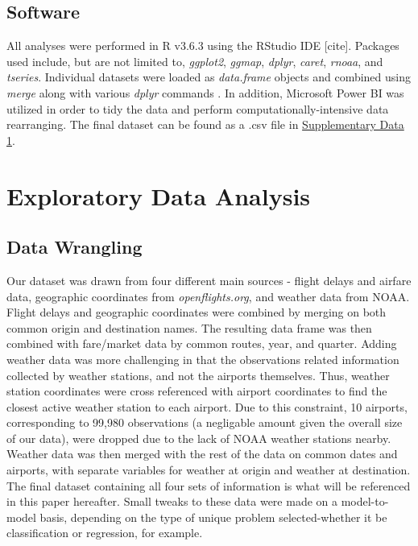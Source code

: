 \documentclass[12pt, a4paper]{book}
\newcommand\tab[1][1cm]{\hspace*{#1}}
\begin{document}
	\section{Software}
	\tab All analyses were performed in R v3.6.3 using the RStudio IDE [cite]. Packages used include, but are not limited to, \textit{ggplot2}, \textit{ggmap}, \textit{dplyr}, \textit{caret}, \textit{rnoaa}, and \textit{tseries}. Individual datasets were loaded as \textit{data.frame} objects and combined using \textit{merge} along with various \textit{dplyr} commands . In addition, Microsoft Power BI was utilized in order to tidy the data and perform computationally-intensive data rearranging. The final dataset can be found as a .csv file in \underline{Supplementary Data 1}.
	
\chapter{Exploratory Data Analysis}

	\section{Data Wrangling}
	
	\tab Our dataset was drawn from four different main sources - flight delays and airfare data, geographic coordinates from \textit{openflights.org}, and weather data from NOAA. Flight delays and geographic coordinates were combined by merging on both common origin and destination names. The resulting data frame was then combined with fare/market data by common routes, year, and quarter. Adding weather data was more challenging in that the observations related information collected by weather stations, and not the airports themselves. Thus, weather station coordinates were cross referenced with airport coordinates to find the closest active weather station to each airport. Due to this constraint, 10 airports, corresponding to 99,980 observations (a negligable amount given the overall size of our data), were dropped due to the lack of NOAA weather stations nearby. Weather data was then merged with the rest of the data on common dates and airports, with separate variables for weather at origin and weather at destination. The final dataset containing all four sets of information is what will be referenced in this paper hereafter. Small tweaks to these data were made on a model-to-model basis, depending on the type of unique problem selected-whether it be classification or regression, for example. \\
	
\end{document}
